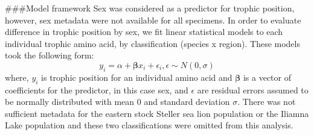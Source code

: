 \documentclass [11pt, proquest] {uwthesis}[2015/03/03]
\begin{document}
\#\#\#Model framework
Sex was considered as a predictor for trophic position, however, sex metadata were not available for all specimens. In order to evaluate difference in trophic position by sex, we fit linear statistical models to each individual trophic amino acid, by classification (species x region). These models took the following form:
\begin{equation} 
y_i = \alpha + \boldsymbol\beta x_i + \epsilon_i, \epsilon \sim N(0,\sigma)
  \label{eq:linsex}
\end{equation}
where, \(y_i\) is trophic position for an individual amino acid and \(\boldsymbol\beta\) is a vector of coefficients for the predictor, in this case sex, and \(\epsilon\) are residual errors assumed to be normally distributed with mean 0 and standard deviation \(\sigma\). There was not sufficient metadata for the eastern stock Steller sea lion population or the Iliamna Lake population and these two classifications were omitted from this analysis.
\end{document}
